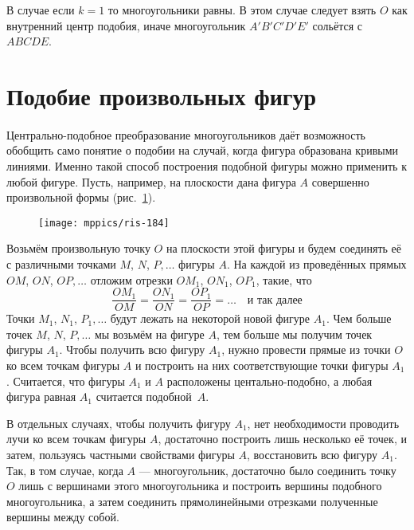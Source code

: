 В случае если $k=1$ то многоугольники равны.
В этом случае следует взять $O$ как внутренний центр подобия, иначе многоугольник $A'B'C'D'E'$ сольётся с $ABCDE$.

\section{Подобие произвольных фигур}

\paragraph{}\label{1938/177}
{\sloppy 
Центрально-подобное преобразование многоугольников даёт возможность обобщить само понятие о подобии на случай, когда фигура образована кривыми линиями.
Именно такой способ построения подобной фигуры можно применить к любой фигуре.
Пусть, например, на плоскости дана фигура $A$ совершенно произвольной формы (рис.~\ref{1938/ris-184}).

}

\begin{figure}[h]
\centering
\texttt{[image: mppics/ris-184]}
\caption{}\label{1938/ris-184}
\end{figure}

Возьмём произвольную точку $O$ на плоскости этой фигуры и будем соединять её с различными точками $M$, $N$, $P,\dots$
фигуры $A$.
На каждой из проведённых прямых $OM$, $ON$, $OP,\dots$
отложим отрезки $OM_1$, $ON_1$, $OP_1$, такие, что 
\[\frac{OM_1}{OM}=\frac{ON_1}{ON}=\frac{OP_1}{OP}=\dots\quad\text{и так далее}\]
Точки $M_1$, $N_1$, $P_1,\dots$ будут лежать на некоторой новой фигуре $A_1$.
Чем больше точек $M$, $N$, $P,\dots$
мы возьмём на фигуре $A$, тем больше мы получим точек фигуры $A_1$.
Чтобы получить всю фигуру $A_1$, нужно провести прямые из точки $O$ ко всем точкам фигуры $A$ и построить на них соответствующие точки фигуры $A_1$.
Считается, что фигуры $A_1$ и $A$ расположены центально-подобно,
а любая фигура равная $A_1$ считается подобной~$A$.

В отдельных случаях, чтобы получить фигуру $A_1$, нет необходимости проводить лучи ко всем точкам фигуры $A$, достаточно построить лишь несколько её точек, и затем, пользуясь частными свойствами фигуры $A$, восстановить всю фигуру $A_1$.
Так, в том случае, когда $A$ — многоугольник, достаточно было соединить точку $O$ лишь с вершинами этого многоугольника и построить вершины подобного многоугольника, а затем соединить прямолинейными отрезками полученные вершины между собой.

